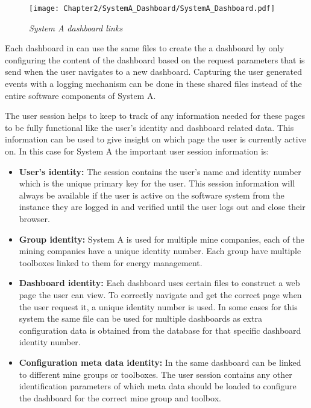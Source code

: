 \begin{figure}[!htb] %
	\centering %
	\texttt{[image: Chapter2/SystemA\_Dashboard/SystemA\_Dashboard.pdf]}
	\caption[System A dashboard links]
	{\textit{System A dashboard links}}\label{fig:ch2_SystemA_Dashboard}
\end{figure}

\clearpage

Each dashboard in  can use the same files to create the a dashboard by only configuring the content of the dashboard based on the request parameters that is send when the user navigates to a new dashboard. Capturing the user generated events with a logging mechanism can be done in these shared files instead of the entire software components of System A.\par The user session helps to keep to track of any information needed for these pages to be fully functional like the user's identity and dashboard related data. This information can be used to give insight on which page the user is currently active on. In this case for System A the important user session information is:

\begin{itemize}
	\item \textbf{User's identity:} The session contains the user's name and identity number which is the unique primary key for the user. This session information will always be available if the user is active on the software system from the instance they are logged in and verified until the user logs out and close their browser.
	\item \textbf{Group identity:} System A is used for multiple mine companies, each of the mining companies have a unique identity number. Each group have multiple toolboxes linked to them for energy management.
	\item \textbf{Dashboard identity:} Each dashboard uses certain files to construct a web page the user can view. To correctly navigate and get the correct page when the user request it, a unique identity number is used. In some cases for this system the same file can be used for multiple dashboards as extra configuration data is obtained from the database for that specific dashboard identity number.
	\item \textbf{Configuration meta data identity:} In  the same dashboard can be linked to different mine groups or toolboxes. The user session contains any other identification parameters of which meta data should be loaded to configure the dashboard for the correct mine group and toolbox.
\end{itemize}

